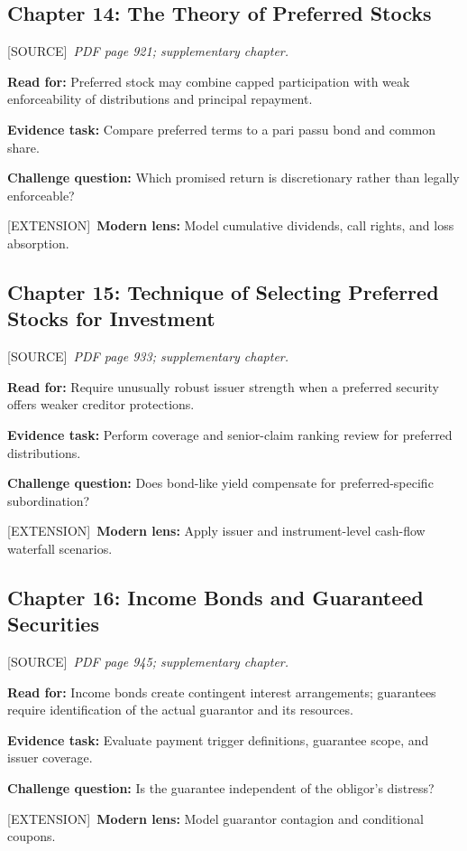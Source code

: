 \documentclass[11pt,letterpaper]{article}
\newcommand{\src}{\textsf{\color{sea}[SOURCE]}}
\newcommand{\ext}{\textsf{\color{gold}[EXTENSION]}}
\begin{document}
\subsection{Chapter 14: The Theory of Preferred Stocks}
\src\ \textit{PDF page 921; supplementary chapter.}\par
\textbf{Read for:} Preferred stock may combine capped participation with weak enforceability of distributions and principal repayment.\par
\textbf{Evidence task:} Compare preferred terms to a pari passu bond and common share.\par
\textbf{Challenge question:} Which promised return is discretionary rather than legally enforceable?\par
\ext\ \textbf{Modern lens:} Model cumulative dividends, call rights, and loss absorption.\par

\subsection{Chapter 15: Technique of Selecting Preferred Stocks for Investment}
\src\ \textit{PDF page 933; supplementary chapter.}\par
\textbf{Read for:} Require unusually robust issuer strength when a preferred security offers weaker creditor protections.\par
\textbf{Evidence task:} Perform coverage and senior-claim ranking review for preferred distributions.\par
\textbf{Challenge question:} Does bond-like yield compensate for preferred-specific subordination?\par
\ext\ \textbf{Modern lens:} Apply issuer and instrument-level cash-flow waterfall scenarios.\par

\subsection{Chapter 16: Income Bonds and Guaranteed Securities}
\src\ \textit{PDF page 945; supplementary chapter.}\par
\textbf{Read for:} Income bonds create contingent interest arrangements; guarantees require identification of the actual guarantor and its resources.\par
\textbf{Evidence task:} Evaluate payment trigger definitions, guarantee scope, and issuer coverage.\par
\textbf{Challenge question:} Is the guarantee independent of the obligor's distress?\par
\ext\ \textbf{Modern lens:} Model guarantor contagion and conditional coupons.\par
\end{document}
